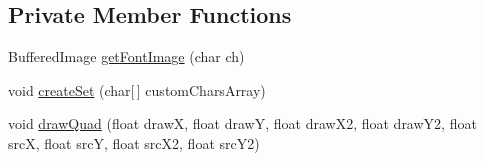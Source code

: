 \subsection*{Private Member Functions}
\begin{DoxyCompactItemize}
\item 
Buffered\+Image \mbox{\hyperlink{classorg_1_1newdawn_1_1slick_1_1_true_type_font_aab88533daf9111e6f9c1514da3426d68}{get\+Font\+Image}} (char ch)
\item 
void \mbox{\hyperlink{classorg_1_1newdawn_1_1slick_1_1_true_type_font_ab68a888a4721942a09812e27bccddced}{create\+Set}} (char\mbox{[}$\,$\mbox{]} custom\+Chars\+Array)
\item 
void \mbox{\hyperlink{classorg_1_1newdawn_1_1slick_1_1_true_type_font_a0086e7a568d5ecd92f718bb2c31890f5}{draw\+Quad}} (float drawX, float drawY, float draw\+X2, float draw\+Y2, float srcX, float srcY, float src\+X2, float src\+Y2)
\end{DoxyCompactItemize}

